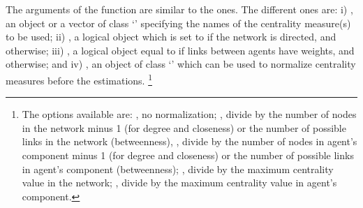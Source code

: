\documentclass[nojss]{jss}
\begin{document}
The arguments of the function  are similar to the
 ones.  The different ones are: i) , an
object or a vector of class `' specifying the names of the
centrality measure(s) to be used; ii) , a logical object
which is set to  if the network is directed, and 
otherwise; iii) , a logical object equal to  if
links between agents have weights, and  otherwise; and iv)
, an object of class `' which can be used to
normalize centrality measures before the estimations.  \footnote{The options
available are: , no normalization; , divide by the
number of nodes in the network minus 1 (for degree and closeness) or the
number of possible links in the network (betweenness), ,
divide by the number of nodes in agent's component minus 1 (for degree and
closeness) or the number of possible links in agent's component
(betweenness); , divide by the maximum centrality value in
the network; , divide by the maximum centrality value
in agent's component.}
\end{document}
